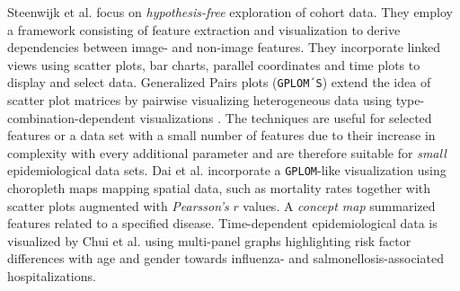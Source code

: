 \documentclass[journal]{style/vgtc} 			          %
\begin{document}
Steenwijk et al. \cite{Steenwijk} focus on \emph{hypothesis-free} exploration of cohort data.
They employ a framework consisting of feature extraction and visualization to derive dependencies between image- and non-image features.
They incorporate linked views using scatter plots, bar charts, parallel coordinates and time plots to display and select data.
Generalized Pairs plots (\texttt{GPLOM´S}) extend the idea of scatter plot matrices by pairwise visualizing heterogeneous data using type-combination-dependent visualizations \cite{GPLOMS, Francois2013}.
The techniques are useful for selected features or a data set with a small number of features due to their increase in complexity with every additional parameter and are therefore suitable for \emph{small} epidemiological data sets.
Dai et al. \cite{Dai2005} incorporate a \texttt{GPLOM}-like visualization using choropleth maps mapping spatial data, such as mortality rates together with scatter plots augmented with \emph{Pearsson's} $r$ values.
A \emph{concept map} summarized features related to a specified disease.
Time-dependent epidemiological data is visualized by Chui et al. \cite{Chui2011} using multi-panel graphs highlighting risk factor differences with age and gender towards influenza- and salmonellosis-associated hospitalizations.
\end{document}
